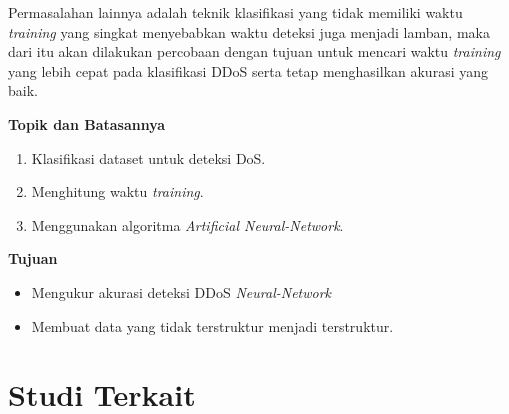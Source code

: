 Permasalahan lainnya adalah teknik klasifikasi yang tidak memiliki waktu \textit{training} yang singkat menyebabkan waktu deteksi juga menjadi lamban, maka dari itu akan dilakukan percobaan dengan tujuan untuk mencari waktu \textit{training} yang lebih cepat pada klasifikasi DDoS serta tetap menghasilkan akurasi yang baik. \\

\bigskip
\noindent\textbf{Topik dan Batasannya}

\begin{enumerate}
    \item Klasifikasi dataset untuk deteksi DoS.
    \item Menghitung waktu \textit{training}.
    \item Menggunakan algoritma \textit{Artificial Neural-Network}.
\end{enumerate}

\noindent\textbf{Tujuan}

\begin{itemize}
    
    \item Mengukur akurasi deteksi DDoS \textit{Neural-Network}
    \item Membuat data yang tidak terstruktur menjadi terstruktur.

\end{itemize}

\section{Studi Terkait}

